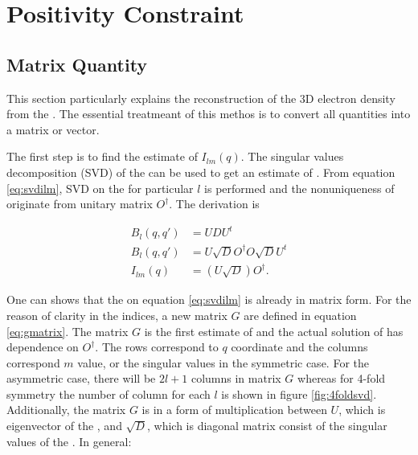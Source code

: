 \section{Positivity Constraint} \label{sec:posconst}
\subsection{Matrix Quantity}
This section particularly explains the reconstruction of the 3D electron density from the \Blq. The essential treatmeant of this methos is to convert all quantities into a matrix or vector. 

The first step is to find the estimate of $I_{lm}(q)$. The singular values decomposition (SVD) of the \Blq can be used to get an estimate of \Ilm. From equation \ref{eq:svdilm}, SVD on the \Blq for particular $l$ is performed and the nonuniqueness of \Ilm originate from unitary matrix $O^{\dagger}$. The derivation is  

\begin{align}
B_{l}(q,q') &= UDU^{t} \\
B_{l}(q,q') &= U\sqrt{D} O^{\dagger} O \sqrt{D} U^{t}  \\
I_{lm}(q)  &= (U \sqrt{D}) O^{\dagger}. 
\label{eq:svdilm}
\end{align}

One can shows that the \Ilm on equation \ref{eq:svdilm} is already in matrix form. For the reason of clarity in the indices, a new matrix $G$ are defined in equation \ref{eq:gmatrix}. The matrix $G$ is the first estimate of \Ilm and the actual solution of \Ilm has dependence on $O^{\dagger}$.  The rows correspond to $q$ coordinate and the columns correspond $m$ value, or the singular values in the symmetric case. For the asymmetric case, there will be $2l+1$ columns in matrix $G$ whereas for 4-fold symmetry the number of column for each $l$ is shown in figure \ref{fig:4foldsvd}. Additionally, the matrix $G$ is in a form of multiplication between $U$, which is eigenvector of the \Blq, and $\sqrt{D}$, which is diagonal matrix consist of the singular values of the \Blq. In general:

